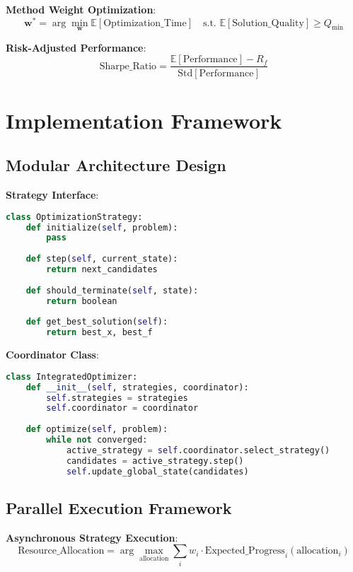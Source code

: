 \documentclass[11pt,a4paper]{article}
\begin{document}
\textbf{Method Weight Optimization}:
\begin{equation}
\mathbf{w}^* = \arg\min_{\mathbf{w}} \mathbb{E}[\text{Optimization\_Time}] \quad \text{s.t. } \mathbb{E}[\text{Solution\_Quality}] \geq Q_{\min}
\end{equation}

\textbf{Risk-Adjusted Performance}:
\begin{equation}
\text{Sharpe\_Ratio} = \frac{\mathbb{E}[\text{Performance}] - R_f}{\text{Std}[\text{Performance}]}
\end{equation}

\section{Implementation Framework}

\subsection{Modular Architecture Design}

\textbf{Strategy Interface}:
\begin{lstlisting}[language=Python]
class OptimizationStrategy:
    def initialize(self, problem):
        pass
    
    def step(self, current_state):
        return next_candidates
    
    def should_terminate(self, state):
        return boolean
    
    def get_best_solution(self):
        return best_x, best_f
\end{lstlisting}

\textbf{Coordinator Class}:
\begin{lstlisting}[language=Python]
class IntegratedOptimizer:
    def __init__(self, strategies, coordinator):
        self.strategies = strategies
        self.coordinator = coordinator
    
    def optimize(self, problem):
        while not converged:
            active_strategy = self.coordinator.select_strategy()
            candidates = active_strategy.step()
            self.update_global_state(candidates)
\end{lstlisting}

\subsection{Parallel Execution Framework}

\textbf{Asynchronous Strategy Execution}:
\begin{equation}
\text{Resource\_Allocation} = \arg\max_{\text{allocation}} \sum_i w_i \cdot \text{Expected\_Progress}_i(\text{allocation}_i)
\end{equation}
\end{document}
